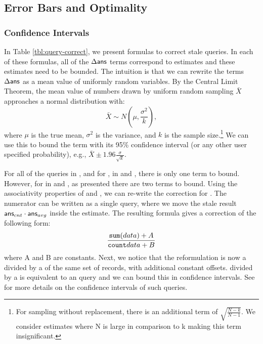 \subsection{Error Bars and Optimality}\label{subsec:correct-practical}
\subsubsection{Confidence Intervals}
In Table \ref{tbl:query-correct}, we present formulas to correct stale queries.
In each of these formulas, all of the $\Delta\textsf{ans}$ terms correspond to estimates and these estimates need to be bounded.
The intuition is that we can rewrite the terms $\Delta\textsf{ans}$ as a mean value of uniformly random variables.
By the Central Limit Theorem, the mean value of numbers drawn by uniform random sampling $\bar{X}$ approaches a normal distribution with:
\[
\bar{X} \sim N(\mu,\frac{\sigma^2}{k}),
\]
where $\mu$ is the true mean, $\sigma^2$ is the variance, and $k$ is the sample size.\footnote{\scriptsize For sampling without replacement, there is an additional term of $\sqrt{\frac{N-k}{N-1}}$. We consider estimates where N is large in comparison to k making this term insignificant.}
We can use this to bound the term with its 95\% confidence interval (or any other user specified probability), e.g., $\bar{X} \pm 1.96 \frac{\sigma}{\sqrt{k}}$.

For all of the queries in \aggview, and for \sumfunc, \countfunc in \spview and \fjview, there is only one term to bound.
However, for \avgfunc in \spview and \fjview, as presented there are two terms to bound.
Using the associativity properties of \countfunc and \sumfunc, we can re-write the correction for \avgfunc.
The numerator can be written as a single \sumfunc query, where we move the stale result $\textsf{ans}_{cnt}\cdot\textsf{ans}_{avg}$ inside the estimate.
The resulting formula gives a correction of the following form:
\[
\frac{\texttt{sum} (data) + A}{\texttt{count}{data} + B}
\]
where A and B are constants.
Next, we notice that the reformulation is now a \sumfunc divided by a \countfunc of the same set of records, with additional constant offsets.
\sumfunc divided by a \countfunc is equivalent to an \avgfunc query and we can bound this in confidence intervals.
See \cite{wang1999sample} for more details on the confidence intervals of such queries.

